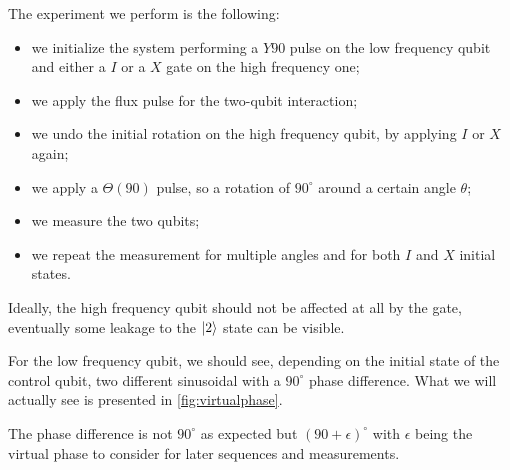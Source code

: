 The experiment we perform is the following:
\begin{itemize}
    \item we initialize the system performing a $Y90$ pulse on the low frequency qubit and either a $I$ or a $X$ gate on the high frequency one;
    \item we apply the flux pulse for the two-qubit interaction;
    \item we undo the initial rotation on the high frequency qubit, by applying $I$ or $X$ again;
    \item we apply a $\Theta(90)$ pulse, so a rotation of $90^\circ$ around a certain angle $\theta$;
    \item we measure the two qubits;
    \item we repeat the measurement for multiple angles and for both $I$ and $X$ initial states.
\end{itemize}

Ideally, the high frequency qubit should not be affected at all by the gate, eventually some leakage to the $\ket 2$ state can be visible.

For the low frequency qubit, we should see, depending on the initial state of the control qubit, two different sinusoidal with a $90^\circ$ phase difference.
What we will actually see is presented in \cref{fig:virtualphase}.

The phase difference is not $90^\circ$ as expected but $(90+\epsilon)^\circ$ with $\epsilon$ being the virtual phase to consider for later sequences and measurements.












